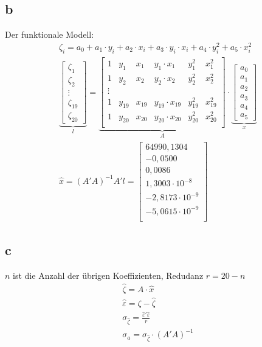 \subsection{b}
Der funktionale Modell:
\begin{gather*}
	\zeta_i = a_0 + a_1 \cdot y_i + a_2 \cdot x_i + a_3 \cdot y_i \cdot x_i + a_4 \cdot y_i^2 + a_5 \cdot x_i^2 \\
	\underbrace{\begin{bmatrix}
		\zeta_1 \\
		\zeta_2 \\
		\vdots \\
		\zeta_{19} \\
		\zeta_{20}
	\end{bmatrix}}_{\text{$l$}} = \underbrace{\begin{bmatrix}
		1 & y_1 & x_1 & y_1 \cdot x_1 & y_1^2 & x_1^2 \\
		1 & y_2 & x_2 & y_2 \cdot x_2 & y_2^2 & x_2^2 \\
		\vdots \\
		1 & y_{19} & x_{19} & y_{19} \cdot x_{19} & y_{19}^2 & x_{19}^2 \\
		1 & y_{20} & x_{20} & y_{20} \cdot x_{20} & y_{20}^2 & x_{20}^2 \\
	\end{bmatrix}}_{\text{$A$}} \cdot \underbrace{\begin{bmatrix}
		a_0 \\
		a_1 \\
		a_2 \\
		a_3 \\
		a_4 \\
		a_5
	\end{bmatrix}}_{\text{$x$}} \\
	\hat{x} = (A'A)^{-1}A'l = \begin{bmatrix}
		64990,1304 \\
		-0,0500 \\
		0,0086 \\
		1,3003 \cdot 10^{-8} \\
		-2,8173 \cdot 10^{-9} \\
		-5,0615 \cdot 10^{-9} \\
	\end{bmatrix}
\end{gather*}
\subsection{c}
$n$ ist die Anzahl der übrigen Koeffizienten, Redudanz $r = 20 - n$
\begin{gather*}
	\hat{\zeta} = A \cdot \hat{x} \\
	\hat{\varepsilon} = \zeta - \hat{\zeta} \\
	\sigma_{\hat{\zeta}} = \frac{\hat{\varepsilon}'\hat{\varepsilon}}{r} \\
	\sigma_a = \sigma_{\hat{\zeta}} \cdot (A'A)^{-1}
\end{gather*}
